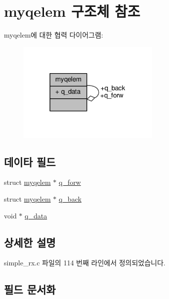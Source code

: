 \hypertarget{structmyqelem}{}\section{myqelem 구조체 참조}
\label{structmyqelem}


myqelem에 대한 협력 다이어그램\+:
\nopagebreak
\begin{figure}[H]
\begin{center}
\leavevmode
\includegraphics[width=195pt]{structmyqelem__coll__graph}
\end{center}
\end{figure}
\subsection*{데이타 필드}
\begin{DoxyCompactItemize}
\item 
struct \hyperlink{structmyqelem}{myqelem} $\ast$ \hyperlink{structmyqelem_a0d26e2f3a0ea8cd77d99a2f2e6524d3b}{q\+\_\+forw}
\item 
struct \hyperlink{structmyqelem}{myqelem} $\ast$ \hyperlink{structmyqelem_a5f8edc46d06b598c73d0f9a21337ce67}{q\+\_\+back}
\item 
void $\ast$ \hyperlink{structmyqelem_acb8f87bdd4c71e7f394698031ea1d365}{q\+\_\+data}
\end{DoxyCompactItemize}


\subsection{상세한 설명}


simple\+\_\+rx.\+c 파일의 114 번째 라인에서 정의되었습니다.



\subsection{필드 문서화}
